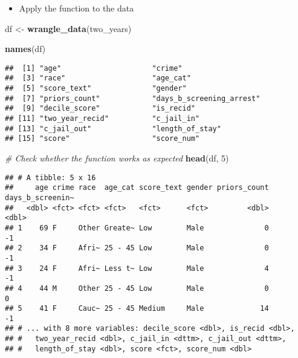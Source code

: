 \documentclass[
]{book}
\newenvironment{Shaded}{\begin{snugshade}}{\end{snugshade}}
\newcommand{\CommentTok}[1]{\textcolor[rgb]{0.56,0.35,0.01}{\textit{#1}}}
\newcommand{\DecValTok}[1]{\textcolor[rgb]{0.00,0.00,0.81}{#1}}
\newcommand{\KeywordTok}[1]{\textcolor[rgb]{0.13,0.29,0.53}{\textbf{#1}}}
\newcommand{\NormalTok}[1]{#1}
\newcommand{\StringTok}[1]{\textcolor[rgb]{0.31,0.60,0.02}{#1}}
\providecommand{\tightlist}{%
  \setlength{\itemsep}{0pt}\setlength{\parskip}{0pt}}
\begin{document}
\begin{itemize}
\tightlist
\item
  Apply the function to the data
\end{itemize}

\begin{Shaded}
\begin{Highlighting}[]
\NormalTok{df \textless{}{-}}\StringTok{ }\KeywordTok{wrangle\_data}\NormalTok{(two\_years)}

\KeywordTok{names}\NormalTok{(df)}
\end{Highlighting}
\end{Shaded}

\begin{verbatim}
##  [1] "age"                     "crime"                  
##  [3] "race"                    "age_cat"                
##  [5] "score_text"              "gender"                 
##  [7] "priors_count"            "days_b_screening_arrest"
##  [9] "decile_score"            "is_recid"               
## [11] "two_year_recid"          "c_jail_in"              
## [13] "c_jail_out"              "length_of_stay"         
## [15] "score"                   "score_num"
\end{verbatim}

\begin{Shaded}
\begin{Highlighting}[]
\CommentTok{\# Check whether the function works as expected}
\KeywordTok{head}\NormalTok{(df, }\DecValTok{5}\NormalTok{)}
\end{Highlighting}
\end{Shaded}

\begin{verbatim}
## # A tibble: 5 x 16
##     age crime race  age_cat score_text gender priors_count days_b_screenin~
##   <dbl> <fct> <fct> <fct>   <fct>      <fct>         <dbl>            <dbl>
## 1    69 F     Other Greate~ Low        Male              0               -1
## 2    34 F     Afri~ 25 - 45 Low        Male              0               -1
## 3    24 F     Afri~ Less t~ Low        Male              4               -1
## 4    44 M     Other 25 - 45 Low        Male              0                0
## 5    41 F     Cauc~ 25 - 45 Medium     Male             14               -1
## # ... with 8 more variables: decile_score <dbl>, is_recid <dbl>,
## #   two_year_recid <dbl>, c_jail_in <dttm>, c_jail_out <dttm>,
## #   length_of_stay <dbl>, score <fct>, score_num <dbl>
\end{verbatim}
\end{document}
